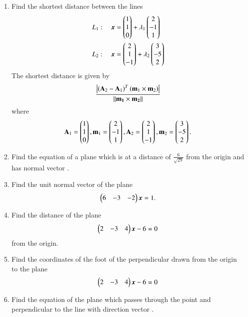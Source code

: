 \begin{enumerate}[label=\arabic*.,ref=\thesubsection.\theenumi]
\item Find the shortest distance between the lines 
\begin{align}
L_1: \quad \bm{x} &= \begin{pmatrix}1\\1\\0\end{pmatrix} + \lambda_1\begin{pmatrix}2 \\ -1 \\1\end{pmatrix}
\\
L_2: \quad \bm{x} &= \begin{pmatrix}2\\1\\-1\end{pmatrix} + \lambda_2\begin{pmatrix}3 \\ -5 \\2\end{pmatrix}
\end{align}
\label{prob:line_dist_skew}
\solution  The shortest distance is given by 
%
\begin{align}
\label{eq:line_dist_skew}
\frac{\left\vert\left(\mathbf{A}_2-\mathbf{A}_1\right)^T\left(\mathbf{m}_1\times\mathbf{m}_2\right)\right\vert}{\left\lVert\mathbf{\mathbf{m}_1\times\mathbf{m}_2}\right\rVert}
\end{align}
%
where
\begin{align}
\mathbf{A}_1= \begin{pmatrix}1\\1\\0\end{pmatrix}, \mathbf{m}_1=\begin{pmatrix}2 \\ -1 \\1\end{pmatrix},
\mathbf{A}_2= \begin{pmatrix}2\\1\\-1\end{pmatrix}, \mathbf{m}_2 =\begin{pmatrix}3 \\ -5 \\2\end{pmatrix}.
\end{align}
\item Find the equation of a plane which is at a distance of $\frac{6}{\sqrt{29}}$ from the origin and has  normal vector .
\item Find the unit normal vector of the plane 
\begin{align}
\begin{pmatrix}6 & -3 & -2\end{pmatrix}\bm{x}  = 1.
\end{align}
\item Find the distance of the plane 
\begin{align}
\begin{pmatrix}2 & -3 & 4\end{pmatrix}\bm{x}-6  = 0
\end{align}
%
from the origin.
\item Find the coordinates of the foot of the perpendicular drawn from the origin to the plane 
\begin{align}
\begin{pmatrix}2 & -3 & 4\end{pmatrix}\bm{x}-6  = 0
\end{align}
%
\item Find the equation of the plane which passes through the point  and perpendicular to the line with direction vector .

\end{enumerate}
